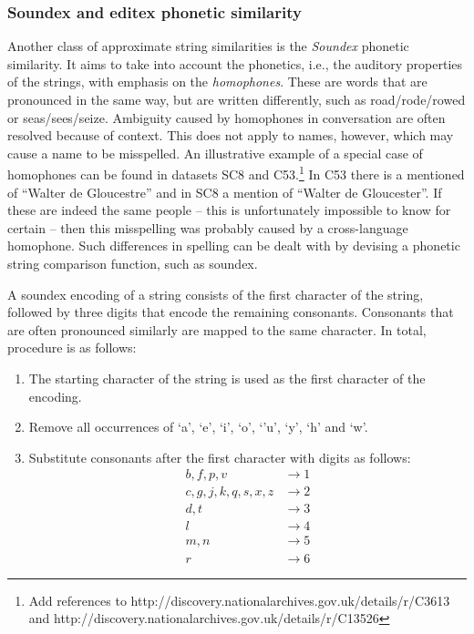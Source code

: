\documentclass[paper=a4, fontsize=11pt]{scrartcl}
\begin{document}
\subsubsection{Soundex and editex phonetic similarity}
Another class of approximate string similarities is the \emph{Soundex} phonetic similarity.
It aims to take into account the phonetics, i.e., the auditory properties of the strings, with emphasis on the \emph{homophones}.
These are words that are pronounced in the same way, but are written differently, such as road/rode/rowed or seas/sees/seize.
Ambiguity caused by homophones in conversation are often resolved because of context.
This does not apply to names, however, which may cause a name to be misspelled.
An illustrative example of a special case of homophones can be found in datasets SC8 and C53.\footnote{Add references to http://discovery.nationalarchives.gov.uk/details/r/C3613 and http://discovery.nationalarchives.gov.uk/details/r/C13526}
In C53 there is a mentioned of ``Walter de Gloucestre'' and in SC8 a mention of ``Walter de Gloucester''.
If these are indeed the same people -- this is unfortunately impossible to know for certain -- then this misspelling was probably caused by a cross-language homophone.
Such differences in spelling can be dealt with by devising a phonetic string comparison function, such as soundex.

A soundex encoding of a string consists of the first character of the string, followed by three digits that encode the remaining consonants.
Consonants that are often pronounced similarly are mapped to the same character.
In total, procedure is as follows:

\begin{enumerate}
    \item The starting character of the string is used as the first character of the encoding.
    \item Remove all occurrences of `a', `e', `i', `o', `'u', `y', `h' and `w'.
    \item Substitute consonants after the first character with digits as follows:\\
            \begin{align*}
                b, f, p, v &\rightarrow 1 \\
                c, g, j, k, q, s, x, z &\rightarrow 2 \\
                d, t &\rightarrow 3 \\
                l &\rightarrow 4 \\
                m, n &\rightarrow 5 \\
                r &\rightarrow 6
            \end{align*}
\end{enumerate}
\end{document}
